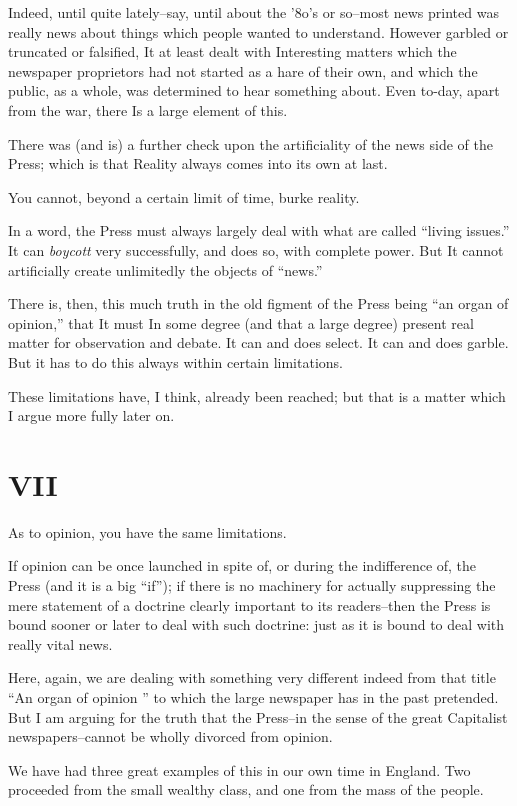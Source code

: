 \documentclass{book}
\begin{document}
Indeed, until quite lately–say, until about the ’8o’s or so–most news printed was really news about things which people wanted to understand. However garbled or truncated or falsified, It at least dealt with Interesting matters which the newspaper proprietors had not started as a hare of their own, and which the public, as a whole, was determined to hear something about. Even to-day, apart from the war, there Is a large element of this.

There was (and is) a further check upon the artificiality of the news side of the Press; which is that Reality always comes into its own at last.

You cannot, beyond a certain limit of time, burke reality.

In a word, the Press must always largely deal with what are called “living issues.” It can \emph{boycott} very successfully, and does so, with complete power. But It cannot artificially create unlimitedly the objects of “news.”

There is, then, this much truth in the old figment of the Press being “an organ of opinion,” that It must In some degree (and that a large degree) present real matter for observation and debate. It can and does select. It can and does garble. But it has to do this always within certain limitations.

These limitations have, I think, already been reached; but that is a matter which I argue more fully later on.

\chapter*{VII}
\label{chapter-8}
As to opinion, you have the same limitations.

If opinion can be once launched in spite of, or during the indifference of, the Press (and it is a big “if”); if there is no machinery for actually suppressing the mere statement of a doctrine clearly important to its readers–then the Press is bound sooner or later to deal with such doctrine: just as it is bound to deal with really vital news.

Here, again, we are dealing with something very different indeed from that title “An organ of opinion ” to which the large newspaper has in the past pretended. But I am arguing for the truth that the Press–in the sense of the great Capitalist newspapers–cannot be wholly divorced from opinion.

We have had three great examples of this in our own time in England. Two proceeded from the small wealthy class, and one from the mass of the people.
\end{document}

